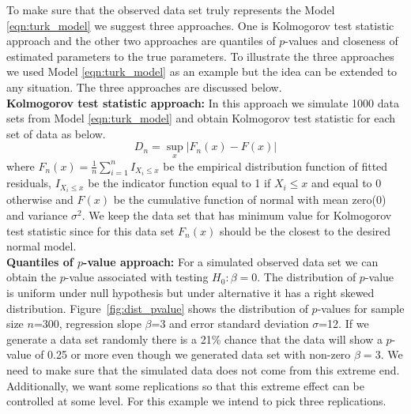 \documentclass[11pt]{article}
\begin{document}
To make sure that the observed data set truly represents the Model \eqref{eqn:turk_model} we suggest three approaches. One is Kolmogorov test statistic approach and the other two approaches are quantiles of $p$-values and closeness of estimated parameters to the true parameters. To illustrate the three approaches we used Model \eqref{eqn:turk_model} as an example but the idea can be extended to any situation. The three approaches are discussed below. \\

{\bf Kolmogorov test statistic approach:} In this approach we simulate 1000 data sets from Model \eqref{eqn:turk_model}  and obtain Kolmogorov test statistic for each set of data as below. $$D_n=\sup_x |F_n(x)-F(x)|$$ where $F_n(x)=\frac1n \sum_{i=1}^n I_{X_i\le x}$ be the empirical distribution function of fitted residuals, $I_{X_i\le x}$ be the indicator function equal to 1 if $X_i\le x$ and equal to 0 otherwise and $F(x)$ be the cumulative function of normal with mean zero(0) and variance $\sigma^2$. We keep the data set that has minimum value for Kolmogorov test statistic since for this data set $F_n(x)$ should be the closest to the desired normal model.  \\

{\bf Quantiles of $p$-value approach:} For a simulated observed data set we can obtain the $p$-value associated with testing $H_0: \beta=0$. The distribution of $p$-value is uniform under null hypothesis but under alternative it has a right skewed distribution. Figure~\ref{fig:dist_pvalue} shows the distribution  of $p$-values for sample size $n$=300, regression slope $\beta$=3 and error standard deviation $\sigma$=12. If we generate a data set randomly there is a 21\% chance that the data will show a $p$-value of 0.25 or more even though we generated data set with non-zero $\beta=3$. We need to make sure that the simulated data does not come from this extreme end. Additionally, we want some replications so that this extreme effect can be controlled at some level. For this example we intend to pick three replications.
\end{document}
